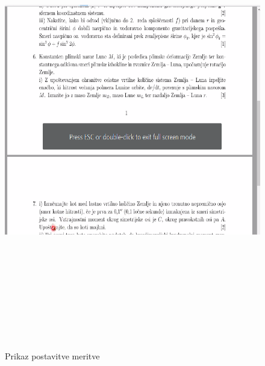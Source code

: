 \documentclass[11pt, a4paper]{article}
\theoremstyle{definition}
\theoremstyle{example}
\theoremstyle{izrek}
\begin{document}
\begin{figure}[H]
    \centering
    \includegraphics[width=17cm, height=20cm]{Screenshot 1.png}
    \caption{Prikaz postavitve meritve}
\end{figure}
\pagebreak
\end{document}
